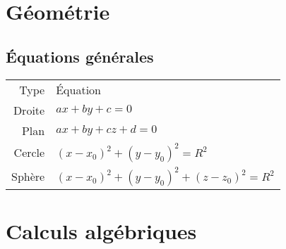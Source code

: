 \documentclass[11pt,a4paper,fleqn,pdftex]{report}
\begin{document}
\chapter{Géométrie} %
\label{cha:geometrie}
\section{Équations générales} %
\label{sec:equations_generales}
\begin{tabular}{r | l}
     Type       & Équation \\
     Droite     & $ax + by +c = 0$ \\
     Plan       & $ax + by +cz +d = 0$ \\
     Cercle     & $(x-x_0)^2 + (y-y_0)^2 = R^2$ \\
     Sphère     & $(x-x_0)^2 + (y-y_0)^2  + (z-z_0)^2 = R^2$
\end{tabular}
\chapter{Calculs algébriques} %
\label{cha:calculs_algebriques}
\end{document}
